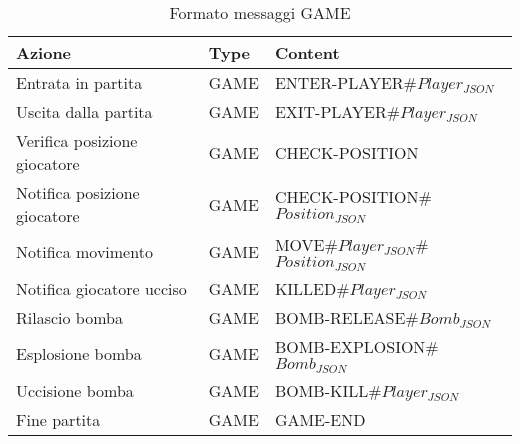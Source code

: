 \documentclass[a4paper]{report}
\begin{document}
\begin{table}[H]
	\centering
	\caption{Formato messaggi GAME}
	\label{format-game}
	{\renewcommand{\arraystretch}{1.8}
		\begin{tabular}{@{}lll@{}}
			\toprule
			\rowcolor[HTML]{FFCCC9} 
			{\color[HTML]{333333} Azione} & {\color[HTML]{333333} Type}	& {\color[HTML]{333333} Content} \\ \midrule
			Entrata in partita            & GAME	& ENTER-PLAYER\#$Player_{JSON}$	\\ \bottomrule	
			Uscita dalla partita            & GAME	& EXIT-PLAYER\#$Player_{JSON}$	\\ \bottomrule	
			Verifica posizione giocatore            & GAME	& CHECK-POSITION	\\ \bottomrule
			Notifica posizione giocatore            & GAME	& CHECK-POSITION\#$Position_{JSON}$	\\ \bottomrule
			Notifica movimento           & GAME	& MOVE\#$Player_{JSON}$\#$Position_{JSON}$	\\ \bottomrule
			Notifica giocatore ucciso            & GAME	& KILLED\#$Player_{JSON}$	\\ \bottomrule
			Rilascio bomba            & GAME	& BOMB-RELEASE\#$Bomb_{JSON}$	\\ \bottomrule
			Esplosione bomba            & GAME	& BOMB-EXPLOSION\#$Bomb_{JSON}$	\\ \bottomrule
			Uccisione bomba            & GAME	& BOMB-KILL\#$Player_{JSON}$	\\ \bottomrule
			Fine partita            & GAME	& GAME-END	\\ \bottomrule
		\end{tabular}
	}
\end{table}
	
\end{document}
